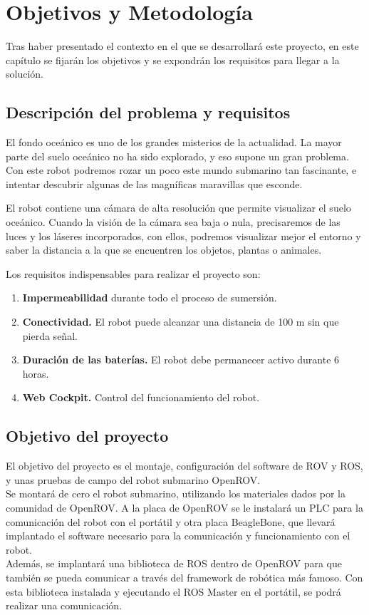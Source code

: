 \chapter{Objetivos y Metodología}
\label{cap:objetivos}
Tras haber presentado el contexto en el que se desarrollará este proyecto, en este capítulo se fijarán los objetivos y se expondrán los requisitos para llegar a la solución.
\section{Descripción del problema y requisitos}
\label{sec:descripciondelproblema}

El fondo oceánico es uno de los grandes misterios de la actualidad. La mayor parte del suelo oceánico no ha sido explorado, y eso supone un gran problema. Con este robot podremos rozar un poco este mundo submarino tan fascinante, e intentar descubrir algunas de las magníficas maravillas que esconde.

El robot contiene una cámara de alta resolución que permite visualizar el suelo oceánico. Cuando la visión de la cámara sea baja o nula, precisaremos de las luces y los láseres incorporados, con ellos, podremos visualizar mejor el entorno y saber la distancia a la que se encuentren los objetos, plantas o animales. 

Los requisitos indispensables para realizar el proyecto son:
\begin{enumerate}
\item \textbf{Impermeabilidad} durante todo el proceso de sumersión.
\item \textbf{Conectividad.} El robot puede alcanzar una distancia de 100 m sin que pierda señal.
\item \textbf{Duración de las baterías.} El robot debe permanecer activo durante 6 horas. 
\item \textbf{Web Cockpit.} Control del funcionamiento del robot.
\end{enumerate}

\section{Objetivo del proyecto}
\label{sec:objetivos}

El objetivo del proyecto es el montaje, configuración del software de ROV y ROS, y unas pruebas de campo del robot submarino OpenROV. 
\\Se montará de cero el robot submarino, utilizando los materiales dados por la comunidad de OpenROV. A la placa de OpenROV se le instalará un PLC para la comunicación del robot con el portátil y otra placa BeagleBone, que llevará implantado el software necesario para la comunicación y funcionamiento con el robot.
\\Además, se implantará una biblioteca de ROS dentro de OpenROV para que también se pueda comunicar a través del framework de robótica más famoso. Con esta biblioteca instalada y ejecutando el ROS Master en el portátil, se podrá realizar una comunicación.

